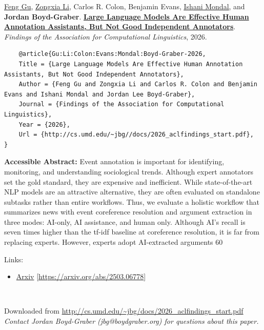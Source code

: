 \documentclass[a4paper]{article}
\begin{document}
    \underline{Feng Gu}, \underline{\href{https://zli12321.github.io/}{Zongxia Li}}, Carlos R. Colon, Benjamin Evans, \underline{\href{https://ishani-mondal.github.io/}{Ishani Mondal}}, and {\bf Jordan Boyd-Graber}.  {\bf \href{http://cs.umd.edu/~jbg//docs/2026_aclfindings_start.pdf}{Large Language Models Are Effective Human Annotation Assistants, But Not Good Independent Annotators}}.  \emph{Findings of the Association for Computational Linguistics}, 2026.



    \vspace{5cm}

    \begin{verbatim}
    @article{Gu:Li:Colon:Evans:Mondal:Boyd-Graber-2026,
	Title = {Large Language Models Are Effective Human Annotation Assistants, But Not Good Independent Annotators},
	Author = {Feng Gu and Zongxia Li and Carlos R. Colon and Benjamin Evans and Ishani Mondal and Jordan Lee Boyd-Graber},
	Journal = {Findings of the Association for Computational Linguistics},
	Year = {2026},
	Url = {http://cs.umd.edu/~jbg//docs/2026_aclfindings_start.pdf},
}

    \end{verbatim}

    {\bf Accessible Abstract:} Event annotation is important for identifying, monitoring, and understanding sociological trends. Although expert annotators set the gold standard, they are expensive and inefficient. While state-of-the-art NLP models are an attractive alternative, they are often evaluated on standalone subtasks rather than entire workflows. Thus, we evaluate a holistic workflow that summarizes news with event coreference resolution and argument extraction in three modes: AI-only, AI assistance, and human only. Although AI's recall is seven times higher than the tf-idf baseline at coreference resolution, it is far from replacing experts. However, experts adopt AI-extracted arguments 60%

    

    \noindent Links:
\begin{itemize}
\item \href{https://arxiv.org/abs/2503.06778}{Arxiv} [\url{https://arxiv.org/abs/2503.06778}]

\end{itemize}\

    \vspace{3cm}
    Downloaded from \url{http://cs.umd.edu/~jbg/docs/2026_aclfindings_start.pdf}  \\

    \vspace{2cm}
    \textit{Contact Jordan Boyd-Graber (jbg@boydgraber.org) for questions about this paper.}

    

    
\end{document}
